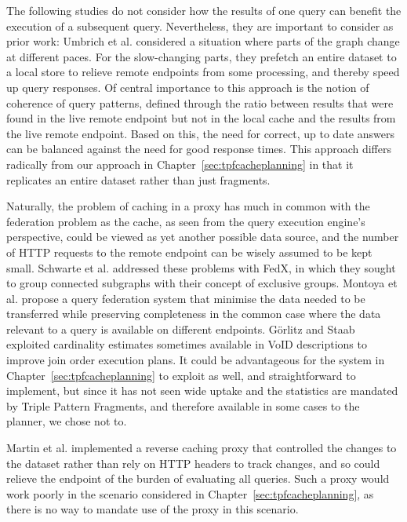 The following studies do not consider how the results of one query can
benefit the execution of a subsequent query. Nevertheless, they are
important to consider as prior work:
Umbrich et al. \cite{umbrich2012hybrid} considered a situation where
parts of the graph change at different paces. For the slow-changing
parts, they prefetch an entire dataset to a local store to relieve
remote endpoints from some processing, and thereby speed up query
responses. Of central importance to this approach is the notion of
coherence of query patterns, defined through the ratio between results
that were found in the live remote endpoint but not in the local cache
and the results from the live remote endpoint. Based on this, the need
for correct, up to date answers can be balanced against the need for
good response times.  This approach differs radically from our
approach in Chapter~\ref{sec:tpfcacheplanning} in that it replicates
an entire dataset rather than just fragments.

Naturally, the problem of caching in a proxy has much in common with
the federation problem as the cache, as seen from the query execution
engine's perspective, could be viewed as yet another possible data
source, and the number of HTTP requests to the remote endpoint can be
wisely assumed to be kept small. Schwarte et
al. \cite{springerlink:10.1007/978-3-642-25073-6-38} addressed these
problems with FedX, in which they sought to group connected subgraphs
with their concept of exclusive groups.  Montoya et
al. \cite{montoya2015federated} propose a query federation system that
minimise the data needed to be transferred while preserving
completeness in the common case where the data relevant to a query is
available on different endpoints. Görlitz and Staab \cite{splendid}
exploited cardinality estimates sometimes available in VoID
\cite{voidnote} descriptions to improve join order execution plans. It
could be advantageous for the system in
Chapter~\ref{sec:tpfcacheplanning} to exploit as well, and
straightforward to implement, but since it has not seen wide uptake
and the statistics are mandated by Triple Pattern Fragments, and
therefore available in some cases to the planner, we chose not to.

Martin et al. \cite{sparqlproxy} implemented a reverse caching proxy
that controlled the changes to the dataset rather than rely on HTTP
headers to track changes, and so could relieve the endpoint of the
burden of evaluating all queries. Such a proxy would work poorly in
the scenario considered in Chapter~\ref{sec:tpfcacheplanning}, as
there is no way to mandate use of the proxy in this scenario.

